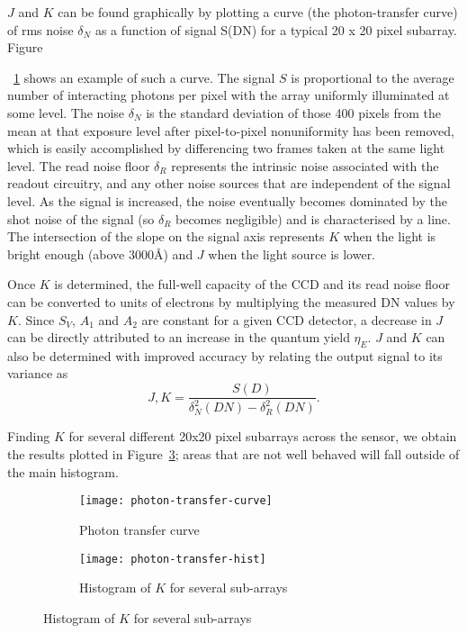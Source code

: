 \documentclass[10pt,fleqn]{article}
\begin{document}
$J$ and $K$ can be found graphically by plotting a curve (the photon-transfer curve) of rms noise $\delta_N$ as a function of signal S(DN) for a typical 20 x 20 pixel subarray. Figure{~\ref{fig:photon-transfer-curve} shows an example of such a curve. The signal $S$ is proportional to the average number of interacting photons per pixel with the array uniformly illuminated at some level. The noise $\delta_N$ is the standard deviation of those 400 pixels from the mean at that exposure level after pixel-to-pixel nonuniformity has been removed, which is easily accomplished by differencing two frames taken at the same light level. The read noise floor $\delta_R$ represents the intrinsic noise associated with the readout circuitry, and any other noise sources that are independent of the signal level. As the signal is increased, the noise eventually becomes dominated by the shot noise of the signal (so $\delta_R$ becomes negligible) and is characterised by a line. The intersection of the slope on the signal axis represents $K$ when the light is bright enough (above 3000{\AA}) and $J$ when the light source is lower.

Once $K$ is determined, the full-well capacity of the CCD and its read noise floor can be converted to units of electrons by multiplying the measured DN values by $K$. Since $S_V$, $A_1$ and $A_2$ are constant for a given CCD detector, a decrease in $J$ can be directly attributed to an increase in the quantum yield $\eta_E$. $J$ and $K$ can also be determined with improved accuracy by relating the output signal to its variance as
\[J, K = \frac{S(D)}{\delta_N^2(DN) - \delta_R^2(DN)}.\]

Finding $K$ for several different 20x20 pixel subarrays across the sensor, we obtain the results plotted in Figure~\ref{fig:photon-transfer-hist}; areas that are not well behaved will fall outside of the main histogram.

\begin{figure}[!ht]
\caption{Example of a photon-transfer curve with $\eta_E = 1$.}
\centering
%
\begin{subfigure}[t]{0.49\textwidth}
\caption{Photon transfer curve}
\label{fig:photon-transfer-curve}
\texttt{[image: photon-transfer-curve]} 
\end{subfigure}
%
\begin{subfigure}[t]{0.49\textwidth}
\caption{Histogram of $K$ for several sub-arrays}
\label{fig:photon-transfer-hist}
\texttt{[image: photon-transfer-hist]} 
\end{subfigure}
%
\end{figure}

}
\end{document}
